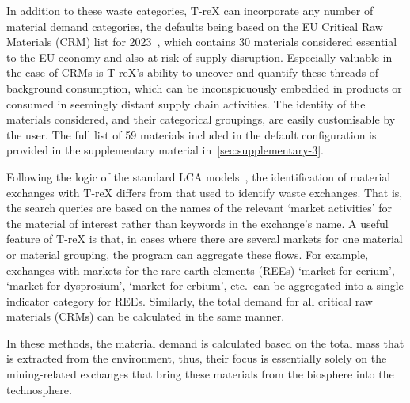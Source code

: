 \documentclass[a4paper,fleqn]{cas-dc}
\begin{document}
	In addition to these waste categories, T-reX can incorporate any number of
	material demand categories, the defaults being based on the EU Critical Raw
	Materials (CRM) list for 2023~\citep{eu2023crmstudy}, which contains 30
	materials considered essential to the EU economy and also at risk of supply
	disruption. Especially valuable in the case of CRMs is T-reX's ability to
	uncover and quantify these threads of background consumption, which can be
	inconspicuously embedded in products or consumed in seemingly distant supply
	chain activities. The identity of the materials considered, and their
	categorical groupings, are easily customisable by the user. The full list of 59
	materials included in the default configuration is provided in the
	supplementary material in~\autoref{sec:supplementary-3}.
	
	Following the logic of the standard LCA models~\cite{ecoinvent2016version3, guinee2004economicallocation},
	the identification of material exchanges with
	T-reX differs from that used to identify waste exchanges. That is, the search
	queries are based on the names of the relevant `market activities' for the
	material of interest rather than keywords in the exchange's name. A useful
	feature of T-reX is that, in cases where there are several markets for one
	material or material grouping, the program can aggregate these flows. For
	example, exchanges with markets for the rare-earth-elements (REEs) `market for
	cerium', `market for dysprosium', `market for erbium', etc.\ can be aggregated
	into a single indicator category for REEs. Similarly, the total demand for all
	critical raw materials (CRMs) can be calculated in the same manner.
	
	In these methods, the material demand is calculated based on the total mass
	that is extracted from the environment, thus, their focus is essentially solely
	on the mining-related exchanges that bring these materials from the biosphere
	into the technosphere.
	
\end{document}
